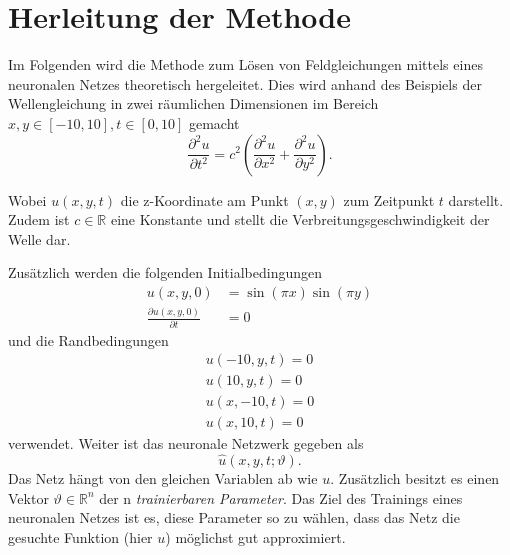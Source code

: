 %
%
%
%

\section{Herleitung der Methode\label{neuronal:section:herleitung}}

Im Folgenden wird die Methode zum Lösen von Feldgleichungen mittels eines neuronalen Netzes theoretisch hergeleitet.
Dies wird anhand des Beispiels der Wellengleichung in zwei räumlichen Dimensionen im Bereich \( x, y \in [-10,10], t \in [0,10] \) gemacht
\begin{equation}
    \frac{\partial^2 u}{\partial t^2} = c^2 \left( \frac{\partial^2 u}{\partial x^2} + \frac{\partial^2 u}{\partial y^2} \right).
    \label{neuronal:wellengleichung}
\end{equation}

Wobei \( u(x, y, t) \) die z-Koordinate am Punkt \( (x, y) \) zum Zeitpunkt \( t \) darstellt. 
Zudem ist \( c \in \mathbb{R} \) eine Konstante und stellt die Verbreitungsgeschwindigkeit der Welle dar.

Zusätzlich werden die folgenden Initialbedingungen
\begin{equation}
    \begin{aligned}
        u(x, y, 0) &= \sin(\pi x) \sin(\pi y)\\
        \frac{\partial u(x, y, 0)}{\partial t} &= 0
    \end{aligned}
    \label{neuronal:initial}
\end{equation}
und die Randbedingungen
\begin{equation}
    \begin{aligned}
        u(-10, y, t) = 0\\
        u(10, y, t) = 0\\
        u(x, -10, t) = 0\\
        u(x, 10, t) = 0
    \end{aligned}
    \label{neuronal:rand}
\end{equation}
verwendet.
Weiter ist das neuronale Netzwerk gegeben als
\begin{equation}
    \hat{u}(x, y, t; \vartheta).
    \label{neuronal:nn}
\end{equation}
Das Netz hängt von den gleichen Variablen ab wie \( u \).
Zusätzlich besitzt es einen Vektor \( \vartheta \in \mathbb{R}^n \) der n \emph{trainierbaren Parameter}.
Das Ziel des Trainings eines neuronalen Netzes ist es, diese Parameter so zu wählen, dass das Netz die gesuchte Funktion (hier \( u \)) möglichst gut approximiert.


